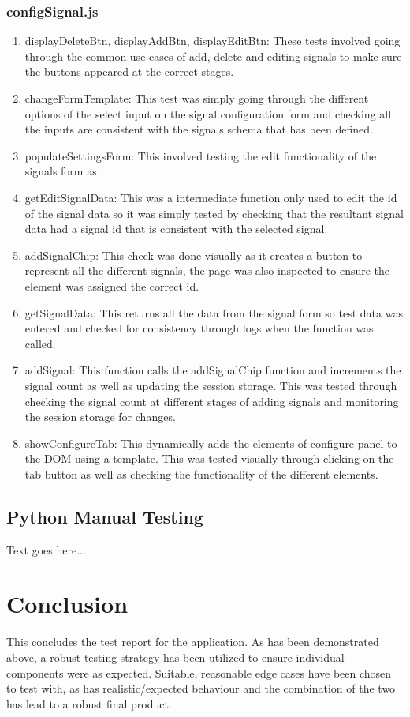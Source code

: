 \subsubsection{configSignal.js}
\begin{enumerate}
\item displayDeleteBtn, displayAddBtn, displayEditBtn: These tests involved going through the common use cases of add, delete and editing signals to make sure the buttons appeared at the correct stages.
\item changeFormTemplate: This test was simply going through the different options of the select input on the signal configuration form and checking all the inputs are consistent with the signals schema that has been defined.
\item populateSettingsForm: This involved testing the edit functionality of the signals form as 
\item getEditSignalData: This was a intermediate function only used to edit the id of the signal data so it was simply tested by checking that the resultant signal data had a signal id that is consistent with the selected signal.
\item addSignalChip: This check was done visually as it creates a button to represent all the different signals, the page was also inspected to ensure the element was assigned the correct id.
\item getSignalData: This returns all the data from the signal form so test data was entered and checked for consistency through logs when the function was called.
\item addSignal: This function calls the addSignalChip function and increments the signal count as well as updating the session storage. This was tested through checking the signal count at different stages of adding signals and monitoring the session storage for changes.
\item showConfigureTab: This dynamically adds the elements of configure panel to the DOM using a template. This was tested visually through clicking on the tab button as well as checking the functionality of the different elements.
\end{enumerate}

\subsection{Python Manual Testing}
Text goes here...

\section{Conclusion}
This concludes the test report for the application. As has been demonstrated above, a robust testing strategy has been utilized to ensure individual components were as expected. Suitable, reasonable edge cases have been chosen to test with, as has realistic/expected behaviour and the combination of the two has lead to a robust final product.

